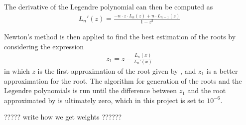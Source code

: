 The derivative of the Legendre polynomial can then be computed as
\begin{align}
	L_n '(z) = \frac{-n\cdot z \cdot L_n (z) +n \cdot L_{n-1} (z)}{1-z^2} 
	\label{eq:GLdMethod4a}
\end{align}

Newton's method is then applied to find the best estimation of the roots by considering the expression
\begin{align}
	z_1 = z- \frac{L_n(x)}{L_n'(x)}
	\label{eq:GLdMethod5}
\end{align}
in which $z$ is the first approximation of the root given by , and $z_1$ is a better approximation for the root. 
The algorithm for generation of the roots and the Legendre polynomials is run until the difference between $z_1$ and the root approximated by  is ultimately zero, which in this project is set to $10^{-6}$.

????? write how we get weights ??????
  

